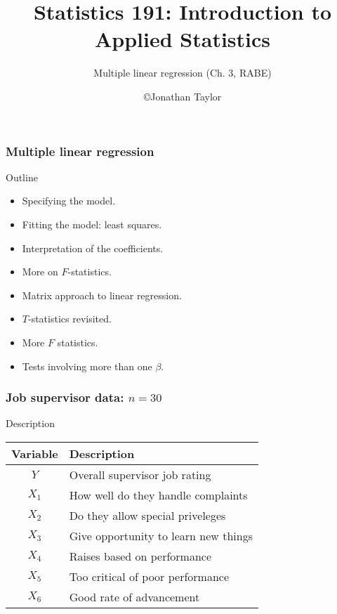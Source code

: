 \documentclass[handout]{beamer}
\title{Statistics 191: Introduction to Applied Statistics}
\subtitle{Multiple linear regression (Ch. 3, RABE)}
\author{\copyright Jonathan Taylor \\
   }
\begin{document}
   \begin{frame}
   \titlepage
   \end{frame}


   \begin{frame} \frametitle{Multiple linear regression}

   \begin{block}
   {Outline}
   \begin{itemize}


   \item Specifying the model.

   \item Fitting the model: least squares.

   \item Interpretation of the coefficients.

   \item More on $F$-statistics.

   \item Matrix approach to linear regression.

   \item $T$-statistics revisited.

   \item More $F$ statistics.

   \item Tests involving more than one $\beta$.

   \end{itemize}
   \end{block}
   \end{frame}


   \begin{frame} \frametitle{Job supervisor data: $n=30$}

   \begin{block}
   {Description}

   \begin{tabular}{c|l}
   Variable & Description \\ \hline
   $Y$ & Overall supervisor job rating \\
   $X_1$ & How well do they handle complaints \\
   $X_2$ & Do they allow  special priveleges \\
   $X_3$ & Give opportunity to learn new things \\
   $X_4$ & Raises based on performance \\
   $X_5$ & Too critical of poor performance\\
   $X_6$ & Good rate of advancement \\
   \end{tabular}
   \end{block}
   \end{frame}
\end{document}
